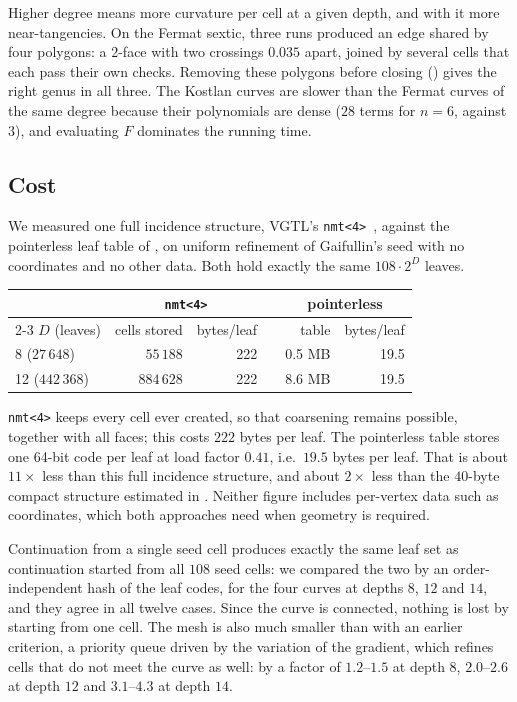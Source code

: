\documentclass[11pt]{article}
\theoremstyle{plain}
\theoremstyle{definition}
\theoremstyle{remark}
\begin{document}
Higher degree means more curvature per cell at a given depth, and with
it more near-tangencies. On the Fermat sextic, three runs produced an
edge shared by four polygons: a $2$-face with two crossings $0.035$ apart,
joined by several cells that each pass their own checks. Removing these
polygons before closing () gives the right genus in
all three. The Kostlan curves are slower than the Fermat curves of the
same degree because their polynomials are dense ($28$ terms for $n=6$,
against $3$), and evaluating $F$ dominates the running time.

\subsection{Cost}
\label{sec:exp-cost}

We measured one full incidence structure, VGTL's
\texttt{nmt<4>}~\cite{vgtl}, against the pointerless leaf table of
, on uniform refinement of Gaifullin's seed with no
coordinates and no other data. Both hold exactly the same $108\cdot2^D$
leaves.
\begin{center}
\small
\begin{tabular}{@{}lrrrrr@{}}
\toprule
& \multicolumn{2}{c}{\texttt{nmt<4>}} & & \multicolumn{2}{c}{pointerless} \\
\cmidrule{2-3}\cmidrule{5-6}
$D$ (leaves) & cells stored & bytes/leaf & & table & bytes/leaf \\
\midrule
8 ($27\,648$) & $55\,188$ & 222 & & 0.5 MB & 19.5 \\
12 ($442\,368$) & $884\,628$ & 222 & & 8.6 MB & 19.5 \\
\bottomrule
\end{tabular}
\end{center}
\texttt{nmt<4>} keeps every cell ever created, so that coarsening remains
possible, together with all faces; this costs $222$ bytes per leaf. The
pointerless table stores one 64-bit code per leaf at load factor $0.41$,
i.e.\ $19.5$ bytes per leaf. That is about $11\times$ less than this full
incidence structure, and about $2\times$ less than the $40$-byte compact
structure estimated in . Neither figure includes per-vertex
data such as coordinates, which both approaches need when geometry is
required.

Continuation from a single seed cell produces exactly the same leaf set
as continuation started from all $108$ seed cells: we compared the two by
an order-independent hash of the leaf codes, for the four curves at
depths $8$, $12$ and $14$, and they agree in all twelve cases. Since the
curve is connected, nothing is lost by starting from one cell. The mesh
is also much smaller than with an earlier criterion, a priority queue
driven by the variation of the gradient, which refines cells that do not
meet the curve as well: by a factor of $1.2$--$1.5$ at depth $8$,
$2.0$--$2.6$ at depth $12$ and $3.1$--$4.3$ at depth $14$.
\end{document}
